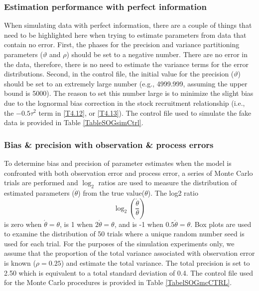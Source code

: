 	
		\subsubsection{Estimation performance with perfect information}
		 
When simulating data with perfect information, there are a couple of things that need to be highlighted here when trying to estimate parameters from data that contain no error.  First, the phases for the precision and variance partitioning parameters ($\vartheta$ and $\rho$) should be set to a negative number.  There are no error in the data, therefore, there is no need to estimate the variance terms for the error distributions.  Second, in the control file, the initial value for the precision ($\vartheta$) should be set to an extremely large number (e.g., 4999.999, assuming the upper bound is 5000).  The reason to set this number large is to minimize the slight bias due to the lognormal bias correction in the stock recruitment relationship (i.e., the $-0.5\tau^2$ term in \ref{T4.12}, or \ref{T4.13}). The control file used to simulate the fake data is provided in Table \ref{TableSOGsimCtrl}.




		
		\subsubsection{Bias \& precision with observation \& process errors}
To determine bias and precision of parameter estimates when the model is confronted with both observation error and process error, a series of Monte Carlo trials are performed and $\log_2$ ratios are used to measure the distribution of estimated parameters ($\acute{\theta}$) from the true value($\theta$).  The log2 ratio
\[ \log_2\left(\frac{\acute{\theta}}{\theta}\right) \] is zero when $\acute{\theta}=\theta$, is 1 when $2\acute{\theta}=\theta$, and is -1 when $0.5\acute{\theta}=\theta$.  Box plots are used to examine the distribution of 50 trials where a unique random number seed is used for each trial.  For the purposes of the simulation experiments only, we assume that the proportion of the total variance associated with observation error is known ($\rho = 0.25$) and estimate the total variance.  The total precision is set to 2.50 which is equivalent to a total standard deviation of 0.4.  The control file used for the Monte Carlo procedures is provided in Table \ref{TabelSOGmcCTRL}.


